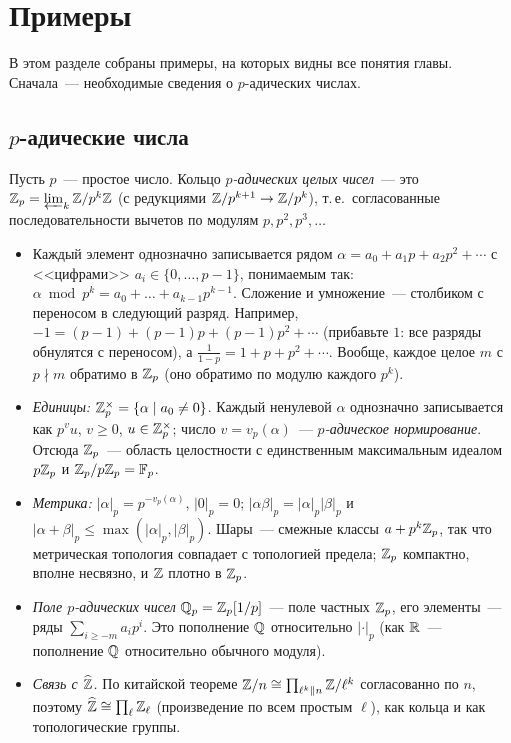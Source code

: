 \section{Примеры}

В этом разделе собраны примеры, на которых видны все понятия главы. Сначала~--- необходимые сведения о $p$-адических
числах.

\subsection*{$p$-адические числа}

\begin{example}
Пусть $p$~--- простое число. Кольцо \emph{$p$-адических целых чисел}~--- это $\mathbb Z_p=\varprojlim_k\mathbb Z/p^k\mathbb Z$ (с редукциями
$\mathbb Z/p^{k+1}\to\mathbb Z/p^k$), т.\,е.\ согласованные последовательности вычетов по модулям $p,p^2,p^3,\dots$
\begin{itemize}[leftmargin=*]
\item Каждый элемент однозначно записывается рядом $\alpha=a_0+a_1p+a_2p^2+\cdots$ с <<цифрами>> $a_i\in\{0,\dots,p-1\}$,
понимаемым так: $\alpha\bmod p^k=a_0+\dots+a_{k-1}p^{k-1}$. Сложение и умножение~--- столбиком с переносом в следующий
разряд. Например, $-1=(p-1)+(p-1)p+(p-1)p^2+\cdots$ (прибавьте $1$: все разряды обнулятся с переносом), а
$\frac1{1-p}=1+p+p^2+\cdots$. Вообще, каждое целое $m$ с $p\nmid m$ обратимо в $\mathbb Z_p$ (оно обратимо по модулю каждого $p^k$).
\item \emph{Единицы:} $\mathbb Z_p^\times=\{\alpha\mid a_0\ne0\}$. Каждый ненулевой $\alpha$ однозначно записывается как $p^vu$,
$v\ge0$, $u\in\mathbb Z_p^\times$; число $v=v_p(\alpha)$~--- \emph{$p$-адическое нормирование}. Отсюда $\mathbb Z_p$~--- область
целостности с единственным максимальным идеалом $p\mathbb Z_p$ и $\mathbb Z_p/p\mathbb Z_p=\mathbb F_p$.
\item \emph{Метрика:} $|\alpha|_p=p^{-v_p(\alpha)}$, $|0|_p=0$; $|\alpha\beta|_p=|\alpha|_p|\beta|_p$ и
$|\alpha+\beta|_p\le\max(|\alpha|_p,|\beta|_p)$. Шары~--- смежные классы $a+p^k\mathbb Z_p$, так что метрическая топология
совпадает с топологией предела; $\mathbb Z_p$ компактно, вполне несвязно, и $\mathbb Z$ плотно в $\mathbb Z_p$.
\item \emph{Поле $p$-адических чисел} $\mathbb Q_p=\mathbb Z_p[1/p]$~--- поле частных $\mathbb Z_p$, его элементы~--- ряды $\sum_{i\ge-m}a_ip^i$.
Это пополнение $\mathbb Q$ относительно $|\cdot|_p$ (как $\mathbb R$~--- пополнение $\mathbb Q$ относительно обычного модуля).
\item \emph{Связь с $\widehat{\mathbb Z}$.} По китайской теореме $\mathbb Z/n\cong\prod_{\ell^k\| n}\mathbb Z/\ell^k$ согласованно по $n$, поэтому
$\widehat{\mathbb Z}\cong\prod_{\ell}\mathbb Z_\ell$ (произведение по всем простым $\ell$), как кольца и как топологические группы.
\end{itemize}
\end{example}

